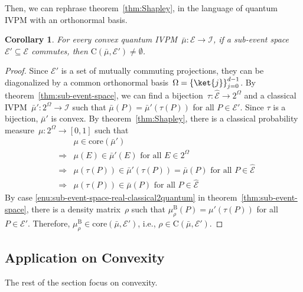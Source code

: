 \documentclass[12pt]{iopart}
\theoremstyle{plain}
\newtheorem{cor}[thm]{Corollary}
\theoremstyle{definition}
\theoremstyle{remark}
\newcommand{\events}{\ensuremath{\mathcal{E}}}
\newcommand{\pmeas}{\ensuremath{\mu}}
\newcommand{\coreBorn}{\ensuremath{\mathrm{C}}}
\begin{document}
Then, we can rephrase theorem~\ref{thm:Shapley}, in the language
of quantum IVPM with an orthonormal basis.

\begin{cor}For every convex quantum IVPM~$\bar{\mu}:\events\rightarrow\mathscr{I}$,
if a sub-event space~$\events'\subseteq\events$ commutes, then $\coreBorn\left(\bar{\mu},\events'\right)\ne\emptyset$.\end{cor}

\begin{proof}Since $\events'$ is a set of mutually commuting projections,
they can be diagonalized by a common orthonormal basis~$\Omega=\left\{ \ket{j}\right\} _{j=0}^{d-1}$.
By theorem~\ref{thm:sub-event-space}, we can find a bijection~$\tau:\widehat{\events}\rightarrow2^{\Omega}$
and a classical IVPM~$\bar{\mu}':2^{\Omega}\rightarrow\mathscr{I}$
such that $\bar{\mu}\left(P\right)=\bar{\mu}'\left(\tau\left(P\right)\right)$
for all $P\in\events'$. Since $\tau$ is a bijection, $\bar{\mu}'$
is convex. By theorem~\ref{thm:Shapley}, there is a classical probability
measure~$\pmeas:2^{\Omega}\rightarrow\left[0,1\right]$ such that
\begin{eqnarray*}
 &  & \pmeas\in\mathrm{core}\left(\bar{\mu}'\right)\\
 & \Rightarrow & \pmeas\left(E\right)\in\bar{\mu}'\left(E\right)\textrm{ for all }E\in2^{\Omega}\\
 & \Rightarrow & \pmeas\left(\tau\left(P\right)\right)\in\bar{\mu}'\left(\tau\left(P\right)\right)=\bar{\mu}\left(P\right)\textrm{ for all }P\in\widehat{\events}\\
 & \Rightarrow & \pmeas\left(\tau\left(P\right)\right)\in\bar{\mu}\left(P\right)\textrm{ for all }P\in\widehat{\events}
\end{eqnarray*}
By case \ref{enu:sub-event-space-real-classical2quantum} in theorem~\ref{thm:sub-event-space},
there is a density matrix~$\rho$ such that $\mu_{\rho}^{\mathrm{B}}\left(P\right)=\mu'\left(\tau\left(P\right)\right)$
for all $P\in\events'$. Therefore, $\mu_{\rho}^{\mathrm{B}}\in\mathrm{core}\left(\bar{\mu},\events'\right)$,
i.e., $\rho\in\coreBorn\left(\bar{\mu},\events'\right)$.\end{proof}

\subsection{Application on Convexity}

The rest of the section focus on convexity.
\end{document}
